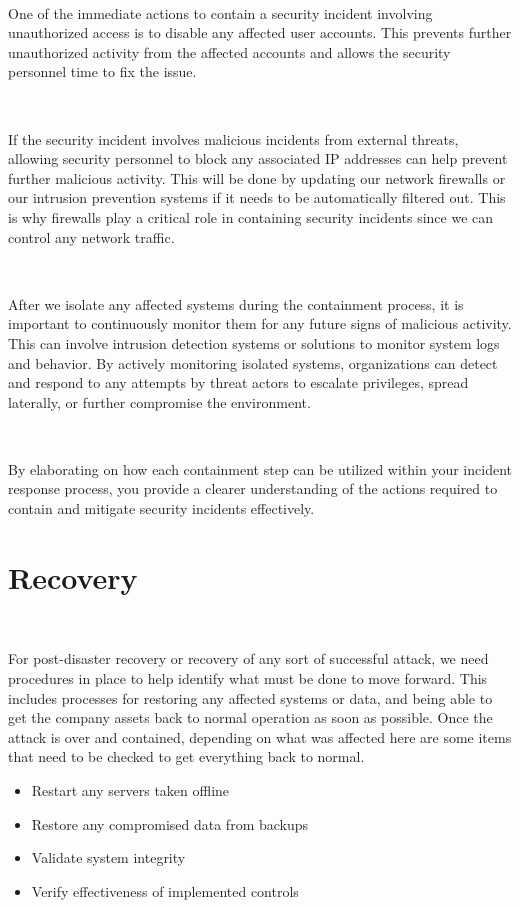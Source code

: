 \documentclass[12pt,a4paper]{report}
\begin{document}
\

One of the immediate actions to contain a security incident involving unauthorized access is to disable any affected user accounts.
This prevents further unauthorized activity from the affected accounts and allows the security personnel time to fix the issue.

\

If the security incident involves malicious incidents from external threats, allowing security personnel to block any associated IP addresses can help prevent further malicious activity.
This will be done by updating our network firewalls or our intrusion prevention systems if it needs to be automatically filtered out.
This is why firewalls play a critical role in containing security incidents since we can control any network traffic. 

\

After we isolate any affected systems during the containment process, it is important to continuously monitor them for any future signs of malicious activity.
This can involve intrusion detection systems or solutions to monitor system logs and behavior.
By actively monitoring isolated systems, organizations can detect and respond to any attempts by threat actors to escalate privileges, spread laterally, or further compromise the environment.

\

By elaborating on how each containment step can be utilized within your incident response process, you provide a clearer understanding of the actions required to contain and mitigate security incidents effectively.

\section{Recovery}
\

For post-disaster recovery or recovery of any sort of successful attack, we need procedures in place to help identify what must be done to move forward.
This includes processes for restoring any affected systems or data, and being able to get the company assets back to normal operation as soon as possible.
Once the attack is over and contained, depending on what was affected here are some items that need to be checked to get everything back to normal.
\begin{itemize}
 \item Restart any servers taken offline
 \item Restore any compromised data from backups
 \item Validate system integrity
 \item Verify effectiveness of implemented controls
\end{itemize}
\end{document}
